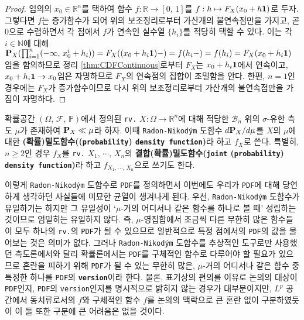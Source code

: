 \begin{proof}
    임의의 $x_0\in\mathbb{R}^n$를 택하여 함수 $f:\mathbb{R}\to[0,\,1]$를 $f:h\mapsto F_X(x_0+h\mathbf{1})$로 두자. 그렇다면 $f$는 증가함수가 되어 위의 보조정리로부터 가산개의 불연속점만을 가지고, 곧 $0$으로 수렴하면서 각 점에서 $f$가 연속인 실수열 $\{h_i\}$를 적당히 택할 수 있다. 이는 각 $i\in\mathbb{N}$에 대해 $\mathbf{P}_X(\prod_{i=1}^n(-\infty,\,x_0^i+h_i))=F_X((x_0+h_i\mathbf{1})-)=f(h_i-)=f(h_i)=F_X(x_0+h_i\mathbf{1})$임을 함의하므로 정리 \ref{thm:CDFContinuous}로부터 $F_X$는 $x_0+h_i\mathbf{1}$에서 연속이고, $x_0+h_i\mathbf{1}\to x_0$임은 자명하므로 $F_X$의 연속점의 집합이 조밀함을 안다. 한편, $n=1$인 경우에는 $F_X$가 증가함수이므로 다시 위의 보조정리로부터 가산개의 불연속점만을 가짐이 자명하다.
\end{proof}

\begin{definition}
    확률공간 $(\Omega,\,\mathcal{F},\,\mathbb{P})$에서 정의된 \texttt{rv.} $X:\Omega\to\mathbb{R}^n$에 대해 적당한 $\mathcal{B}_n$ 위의 $\sigma$-유한 측도 $\mu$가 존재하여 $\mathbf{P}_X\ll\mu$라 하자. 이때 \texttt{Radon-Nikod\'ym} 도함수 $d\mathbf{P}_X/d\mu$를 $X$의 $\mu$에 대한 \textbf{(확률)밀도함수((\texttt{probability}) \texttt{density function})}라 하고 $f_X$로 쓴다. 특별히, $n\geq2$인 경우 $f_X$를 \texttt{rv.} $X_1,\,\cdots,\,X_n$의 \textbf{결합(확률)밀도함수(\texttt{joint} (\texttt{probability}) \texttt{density function})}라 하고 $f_{X_1,\,\cdots,\,X_n}$으로 쓰기도 한다.
\end{definition}

이렇게 \texttt{Radon-Nikod\'ym} 도함수로 \texttt{PDF}를 정의하면서 이번에도 우리가 \texttt{PDF}에 대해 당연하게 생각하던 사실들에 미묘한 균열이 생겨나게 된다. 우선, \texttt{Radon-Nikod\'ym} 도함수가 유일하기는 하지만 그 유일성이 `$\mu$-거의 어디서나 같은 함수를 하나로 볼 때' 성립하는 것이므로 엄밀히는 유일하지 않다. 즉, $\mu$-영집합에서 조금씩 다른 무한히 많은 함수들이 모두 하나의 \texttt{rv.}의 \texttt{PDF}가 될 수 있으므로 일반적으로 특정 점에서의 \texttt{PDF}의 값을 물어보는 것은 의미가 없다. 그러나 \texttt{Radon-Nikod\'ym} 도함수를 추상적인 도구로만 사용했던 측도론에서와 달리 확률론에서는 \texttt{PDF}를 구체적인 함수로 다루어야 할 필요가 있으므로 혼란을 피하기 위해 \texttt{PDF}가 될 수 있는 무한히 많은, $\mu$-거의 어디서나 같은 함수 중 특정한 하나를 \texttt{PDF}의 \textbf{\texttt{version}}이라 한다. 물론, 표기상의 편의를 이유로 논의의 대상이 \texttt{PDF}인지, \texttt{PDF}의 \texttt{version}인지를 명시적으로 밝히지 않는 경우가 대부분이지만, $L^p$ 공간에서 동치류로서의 $f$와 구체적인 함수 $f$를 논의의 맥락으로 큰 혼란 없이 구분하였듯이 이 둘 또한 구분에 큰 어려움은 없을 것이다.

